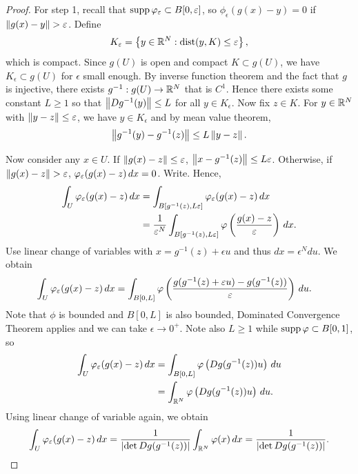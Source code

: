 \documentclass[a4paper]{article}
\begin{document}
\begin{proof}

  For step 1, recall that $\operatorname{supp} \varphi_\varepsilon \subset B[0, \varepsilon]$, so
  $\phi_\epsilon (g(x) - y) = 0$ if $\left\lVert g(x) - y\right\rVert > \varepsilon$. Define
  \[
    K_\varepsilon = \left\{ y \in \mathbb{R}^N : \operatorname{dist}(y, K) \leq \varepsilon \right\},
  \]
  which is compact. Since $g(U)$ is open and compact $K \subset g(U)$, we
  have $K_\epsilon \subset g(U)$ for $\epsilon$ small enough. By inverse
  function theorem and the fact that $g$ is injective, there exists
  $g^{-1} : g(U) \to \mathbb{R}^N$ that is $C^1$. Hence there exists some constant
  $L \geq 1$ so that $\left\lVert D g^{-1} (y)\right\rVert \leq L$ for all $y \in
  K_\epsilon$. Now fix $z \in K$. For $y \in \mathbb{R}^N$ with $\left\lVert y - z\right\rVert \leq
  \varepsilon$, we have $y \in K_\epsilon$ and by mean value theorem,
  \[
    \left\lVert g^{-1} (y) - g^{-1} (z)\right\rVert \leq L \left\lVert y - z\right\rVert.
  \]

  Now consider any $x \in U$. If $\left\lVert g(x) - z\right\rVert \leq \varepsilon$, $\left\lVert x
  - g^{-1}(z)\right\rVert \leq L \varepsilon$. Otherwise, if $\left\lVert g(x) - z\right\rVert >
  \varepsilon$, $\varphi_\varepsilon (g(x) - z) \, d x = 0$. Write. Hence,
  \begin{align*}
    \int_U \varphi_\varepsilon (g(x) - z) \, d x
     & = \int_{B[g^{-1}(z), L \varepsilon]} \varphi_\varepsilon (g(x) - z) \, d x \\
     & = \frac{1}{\varepsilon^N} \int_{B[g^{-1}(z), L \varepsilon]}
    \varphi \left(  \frac{g(x) - z}{\varepsilon} \right) \, d x.
  \end{align*}
  Use linear change of variables with $x = g^{-1}(z) + \epsilon u$ and
  thus $dx = \epsilon^N du$. We obtain
  \begin{align*}
    \int_U \varphi_\varepsilon (g(x) - z) \, d x
     & = \int_{B[0, L]} \varphi \left(
    \frac{g (g^{-1} (z) + \varepsilon u) - g(g^{-1} (z))} {\varepsilon} \right)
    \, d u.
  \end{align*}
  Note that $\phi$ is bounded and $B[0, L]$ is also bounded, Dominated
  Convergence Theorem applies and we can take $\epsilon \to 0^+$. Note
  also $L \geq 1$ while $\operatorname{supp} \varphi \subset B[0, 1]$, so
  \begin{align*}
    \int_U \varphi_\varepsilon (g(x) - z) \, d x
     & = \int_{B[0, L]} \varphi \left( Dg (g^{-1}(z)) u \right) \, d u \\
     & = \int_{\mathbb{R}^N} \varphi \left( Dg (g^{-1}(z)) u \right) \, d u.
  \end{align*}
  Using linear change of variable again, we obtain
  \[
    \int_U \varphi_\varepsilon (g(x) - z) \, d x
    = \frac{1}{\left\lvert \det Dg (g^{-1} (z))\right\rvert} \int_{\mathbb{R}^N} \varphi(x) \, d x
    = \frac{1}{\left\lvert \det Dg (g^{-1} (z))\right\rvert}.
  \]
\end{proof}
\end{document}
